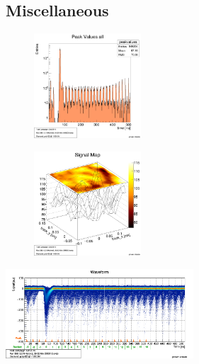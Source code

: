 \documentclass[9pt]{beamer}
\begin{document}
\subsection{Miscellaneous}
\begin{frame}
	\begin{center}
		\begin{minipage}{5.5cm}
			\centering
			\begin{figure}
				\includegraphics[width=4.0cm]{Pics/PeakValues}
			\end{figure}
		\end{minipage}
		\hspace*{2pt}
		\begin{minipage}{5.5cm}
			\centering
			\begin{figure}
				\includegraphics[width=4.0cm]{Pics/2DMap}
			\end{figure}
		\end{minipage}
		\includegraphics[width=7cm]{WaveForms5000}
	\end{center}
\end{frame}
\end{document}
